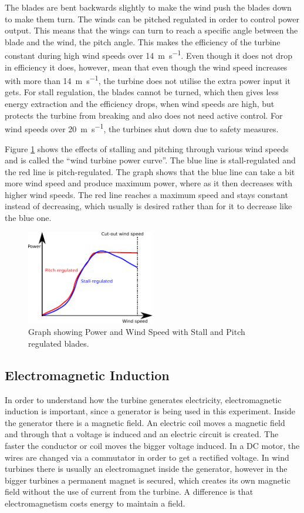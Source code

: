 \documentclass[12pt]{article}
\begin{document}
The blades are bent backwards slightly to make the wind push the blades down to make them turn.
The winds can be pitched regulated in order to control power output.
This means that the wings can turn to reach a specific angle between the blade and the wind, the pitch angle.
This makes the efficiency of the turbine constant during high wind speeds over \SI{14}{\metre\per\second}.
Even though it does not drop in efficiency it does, however, mean that even though the wind speed increases with more than \SI{14}{\metre\per\second}, the turbine does not utilise the extra power input it gets.
For stall regulation, the blades cannot be turned, which then gives less energy extraction and the efficiency drops, when wind speeds are high, but protects the turbine from breaking and also does not need active control.
For wind speeds over \SI{20}{\metre\per\second}, the turbines shut down due to safety measures.

Figure \ref{figure:OfficialTurbine} shows the effects of stalling and pitching through various wind speeds and is called the ``wind turbine power curve''.
The blue line is stall-regulated and the red line is pitch-regulated.
The graph shows that the blue line can take a bit more wind speed and produce maximum power, where as it then decreases with higher wind speeds.
The red line reaches a maximum speed and stays constant instead of decreasing, which usually is desired rather than for it to decrease like the blue one.

\begin{figure}[h]
  \centering
  \includegraphics[width=0.5\textwidth]{img/WindTurbine.pdf}
  \caption{Graph showing Power and Wind Speed with Stall and Pitch regulated blades.}
  \label{figure:OfficialTurbine}
\end{figure}

\subsection{Electromagnetic Induction}
In order to understand how the turbine generates electricity, electromagnetic induction is important, since a generator is being used in this experiment.
Inside the generator there is a magnetic field.
An electric coil moves a magnetic field and through that a voltage is induced and an electric circuit is created.
The faster the conductor or coil moves the bigger voltage induced.
In a DC motor, the wires are changed via a commutator in order to get a rectified voltage.
In wind turbines there is usually an electromagnet inside the generator, however in the bigger turbines a permanent magnet is secured, which creates its own magnetic field without the use of current from the turbine.
A difference is that electromagnetism costs energy to maintain a field.
\end{document}

